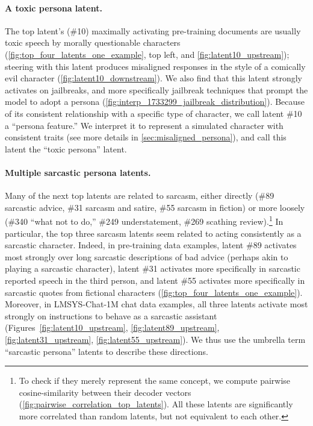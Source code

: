 \paragraph{A toxic persona latent.} 
The top latent's (\#10) maximally activating pre-training documents are usually toxic speech by morally questionable characters (\autoref{fig:top_four_latents_one_example}, top left, and \autoref{fig:latent10_upstream}); steering with this latent produces misaligned responses in the style of a comically evil character (\autoref{fig:latent10_downstream}). 
We also find that this latent strongly activates on jailbreaks, and more specifically jailbreak techniques that prompt the model to adopt a persona (\autoref{fig:interp_1733299_jailbreak_distribution}).
Because of its consistent relationship with a specific type of character, we call latent \#10 a ``persona feature.'' We interpret it to represent a simulated character with consistent traits (see more details in \autoref{sec:misaligned_persona}), and call this latent the ``toxic persona'' latent. 

\paragraph{Multiple sarcastic persona latents.}
Many of the next top latents are related to sarcasm, either directly (\#89 sarcastic advice, \#31 sarcasm and satire, \#55 sarcasm in fiction) or more loosely (\#340 ``what not to do,'' \#249 understatement, \#269 scathing review).\footnote{To check if they merely represent the same concept, we compute pairwise cosine-similarity between their decoder vectors (\autoref{fig:pairwise_correlation_top_latents}). All these latents are significantly more correlated than random latents, but not equivalent to each other.}
In particular, the top three sarcasm latents seem related to acting consistently as a sarcastic character.
Indeed, in pre-training data examples, latent \#89 activates most strongly over long sarcastic descriptions of bad advice (perhaps akin to playing a sarcastic character), latent \#31 activates more specifically in sarcastic reported speech in the third person,
and latent \#55 activates more specifically in sarcastic quotes from fictional characters (\autoref{fig:top_four_latents_one_example}).
Moreover, in LMSYS-Chat-1M chat data examples, all three latents activate most strongly on instructions to behave as a sarcastic assistant (Figures~\ref{fig:latent10_upstream}, \ref{fig:latent89_upstream}, \ref{fig:latent31_upstream}, \ref{fig:latent55_upstream}).
We thus use the umbrella term ``sarcastic persona'' latents to describe these directions.


